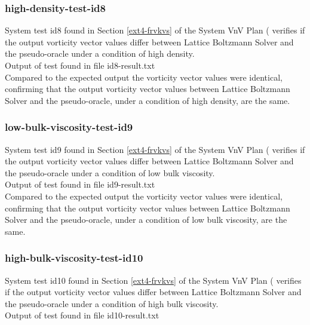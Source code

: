 \documentclass[12pt, titlepage]{article}
\newcommand{\myprogname}{Lattice Boltzmann Solver}
\begin{document}
\subsubsection{high-density-test-id8}

System test id8 found in Section \ref{ext4-frvkvs} of the System VnV Plan (\citet{LBM_SVNV_PM} verifies if the output vorticity vector values differ between {\myprogname} and the pseudo-oracle under a condition of high density.\\

\noindent Output of test found in file id8-result.txt\\

\noindent Compared to the expected output the vorticity vector values were identical, confirming that the output vorticity vector values between {\myprogname} and the pseudo-oracle, under a condition of high density, are the same.\\

\subsubsection{low-bulk-viscosity-test-id9}

System test id9 found in Section \ref{ext4-frvkvs} of the System VnV Plan (\citet{LBM_SVNV_PM} verifies if the output vorticity vector values differ between {\myprogname} and the pseudo-oracle under a condition of low bulk viscosity.\\

\noindent Output of test found in file id9-result.txt\\

\noindent Compared to the expected output the vorticity vector values were identical, confirming that the output vorticity vector values between {\myprogname} and the pseudo-oracle, under a condition of low bulk viscosity, are the same.\\

\subsubsection{high-bulk-viscosity-test-id10}

System test id10 found in Section \ref{ext4-frvkvs} of the System VnV Plan (\citet{LBM_SVNV_PM} verifies if the output vorticity vector values differ between {\myprogname} and the pseudo-oracle under a condition of high bulk viscosity.\\

\noindent Output of test found in file id10-result.txt\\
\end{document}
